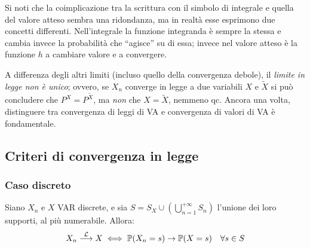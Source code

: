 Si noti che la coimplicazione tra la scrittura con il simbolo di integrale e quella del valore atteso sembra una ridondanza, ma in realtà esse esprimono due concetti differenti. Nell'integrale la funzione integranda è sempre la stessa e cambia invece la probabilità che ``agisce'' su di essa; invece nel valore atteso è la funzione $h$ a cambiare valore e a convergere.

\medskip
\begin{nb} A differenza degli altri limiti (incluso quello della convergenza debole), il \emph{limite in legge \emph{non} è unico};
  ovvero, se $X_n$ converge in legge a due variabili $X$ e $\widetilde{X}$ si può concludere che $P^X = P^{\tilde X}$, ma \emph{non} che $X = \widetilde X$, nemmeno qc.
  Ancora una volta, distinguere tra convergenza di leggi di VA e convergenza di valori di VA è fondamentale.
\end{nb}

\subsection{Criteri di convergenza in legge}
\subsubsection{Caso discreto}
\begin{prop}
  Siano $X_n$ e $X$ VAR discrete, e sia $S = S_X \cup \left(\bigcup\limits_{n=1}^{+\infty}S_n\right)$ l'unione dei loro supporti, al più numerabile. Allora:
  $$ X_n \stackrel{\mathcal L}{\longrightarrow} X \iff \mathbb P(X_n = s)\to \mathbb P(X = s) \quad \forall s \in S$$
\end{prop}

